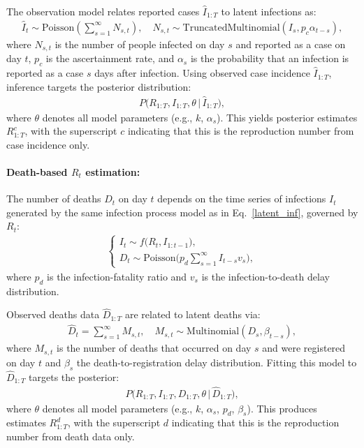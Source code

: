 \documentclass{article}
\begin{document}
The observation model relates reported cases $\widehat{I}_{1:T}$ to latent infections as:
\begin{align}\label{obs_inf}
\widehat{I}_t \sim \mathrm{Poisson}\left( \sum_{s=1}^\infty N_{s,t} \right), \quad N_{s,t} \sim \mathrm{TruncatedMultinomial}(I_s, p_c\alpha_{t-s}),
\end{align}
where $N_{s,t}$ is the number of people infected on day $s$ and reported as a case on day $t$, $p_c$ is the ascertainment rate, and $\alpha_s$ is the probability that an infection is reported as a case $s$ days after infection. Using observed case incidence $\widehat{I}_{1:T}$, inference targets the posterior distribution:
\begin{align}
P\big(R_{1:T}, I_{1:T}, \theta \,\big|\, \widehat{I}_{1:T}\big),
\end{align}
where $\theta$ denotes all model parameters (e.g., $k$, $\alpha_s$). This yields posterior estimates $R_{1:T}^{c}$, with the superscript $c$ indicating that this is the reproduction number from case incidence only.

\paragraph{Death-based $R_{t}$ estimation:}
The number of deaths $D_t$ on day $t$ depends on the time series of infections $I_{t}$ generated by the same infection process model as in Eq.~\eqref{latent_inf}, governed by $R_{t}$:
\begin{align}\label{latent_death}
\begin{cases}
I_t \sim f\big(R_t, I_{1:t-1}\big),\\[4pt]
D_t \sim \mathrm{Poisson}\!\Big( p_d \sum_{s=1}^\infty I_{t-s} v_s \Big),
\end{cases}
\end{align}
where $p_d$ is the infection-fatality ratio and $v_s$ is the infection-to-death delay distribution.

Observed deaths data $\widehat{D}_{1:T}$ are related to latent deaths via:
\begin{align}\label{obs_death}
\widehat{D}_t = \sum_{s=1}^\infty M_{s,t}, \quad M_{s,t} \sim \mathrm{Multinomial}(D_s, \beta_{t-s}),
\end{align}
where $M_{s,t}$ is the number of deaths that occurred on day $s$ and were registered on day $t$ and $\beta_s$ the death-to-registration delay distribution.  
Fitting this model to $\widehat{D}_{1:T}$ targets the posterior:
\begin{align}
P\big(R_{1:T}, I_{1:T}, D_{1:T}, \theta \,\big|\, \widehat{D}_{1:T}\big),
\end{align}
where $\theta$ denotes all model parameters (e.g., $k$, $\alpha_s$, $p_d$, $\beta_s$).  
This produces estimates $R_{1:T}^d$, with the superscript $d$ indicating that this is the reproduction number from death data only.
\end{document}
